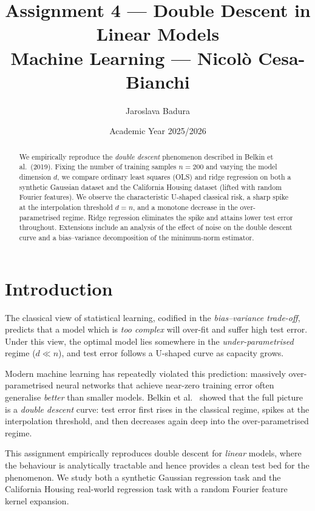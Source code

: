 \documentclass[11pt,a4paper]{article}
\title{\textbf{Assignment 4 --- Double Descent in Linear Models}\\[0.4em]
       \large Machine Learning --- Nicol\`{o} Cesa-Bianchi}
\author{Jaroslava Badura}
\date{Academic Year 2025/2026}
\begin{document}
\maketitle

\begin{abstract}
We empirically reproduce the \emph{double descent} phenomenon described in Belkin et al.\ (2019).
Fixing the number of training samples $n = 200$ and varying the model dimension $d$, we compare
ordinary least squares (OLS) and ridge regression on both a synthetic Gaussian dataset and the
California Housing dataset (lifted with random Fourier features).
We observe the characteristic U-shaped classical risk, a sharp spike at the interpolation threshold
$d = n$, and a monotone decrease in the over-parametrised regime.
Ridge regression eliminates the spike and attains lower test error throughout.
Extensions include an analysis of the effect of noise on the double descent curve and a
bias--variance decomposition of the minimum-norm estimator.
\end{abstract}

\tableofcontents
\newpage

\section{Introduction}
\label{sec:intro}

The classical view of statistical learning, codified in the \emph{bias--variance trade-off},
predicts that a model which is \emph{too complex} will over-fit and suffer high test error.
Under this view, the optimal model lies somewhere in the \emph{under-parametrised} regime
($d \ll n$), and test error follows a U-shaped curve as capacity grows.

Modern machine learning has repeatedly violated this prediction: massively over-parametrised
neural networks that achieve near-zero training error often generalise \emph{better} than
smaller models.
Belkin et al.\ \cite{belkin2019reconciling} showed that the full picture is a
\emph{double descent} curve: test error first rises in the classical regime, spikes at the
interpolation threshold, and then decreases again deep into the over-parametrised regime.

This assignment empirically reproduces double descent for \emph{linear} models, where the
behaviour is analytically tractable and hence provides a clean test bed for the phenomenon.
We study both a synthetic Gaussian regression task and the California Housing real-world
regression task with a random Fourier feature kernel expansion.
\end{document}
